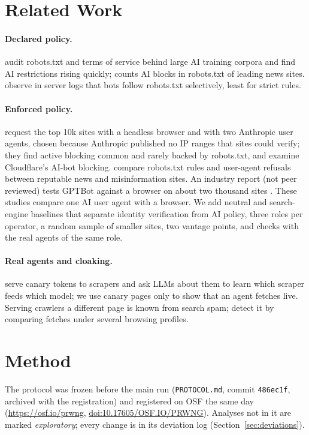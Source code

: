 \documentclass[sigconf,nonacm]{acmart}
\newif\ifanon
\newcommand{\osfdoi}{\href{https://doi.org/10.17605/OSF.IO/PRWNG}{doi:10.17605/OSF.IO/PRWNG}}
\begin{document}
\section{Related Work}
\label{sec:related}
\paragraph{Declared policy.} \citet{longpre2024consent} audit robots.txt and terms of service
behind large AI training corpora and find AI restrictions rising quickly;
\citet{fletcher2024news} counts AI blocks in robots.txt of leading news sites.
\citet{kim2025scrapers} observe in server logs that bots follow robots.txt selectively, least for
strict rules.

\paragraph{Enforced policy.} \citet{liu2025somesite} request the top 10k sites with a headless
browser and with two Anthropic user agents, chosen because Anthropic published no IP ranges that
sites could verify; they find active blocking common and rarely backed by robots.txt, and
examine Cloudflare's AI-bot blocking. \citet{steinacker2026misinfo} compare robots.txt rules and
user-agent refusals between reputable news and misinformation sites. An industry report (not
peer reviewed) tests GPTBot against a browser on about two thousand sites
\citep{hasdata2026index}. These studies compare one AI user agent with a browser. We add
neutral and search-engine baselines that separate identity verification from AI policy, three
roles per operator, a random sample of smaller sites, two vantage points, and checks with the
real agents of the same role.

\paragraph{Real agents and cloaking.} \citet{seiden2026canary} serve canary tokens to scrapers
and ask LLMs about them to learn which scraper feeds which model; we use canary pages only to show
that an agent fetches live. Serving crawlers a different page is known from search spam;
\citet{invernizzi2016cloak} detect it by comparing fetches under several browsing profiles.

\section{Method}
\label{sec:method}
The protocol was frozen before the main run (\texttt{PROTOCOL.md}, commit \texttt{486ec1f}, archived with the registration) and
registered on OSF the same day
\ifanon(link withheld)\else(\url{https://osf.io/prwng}, \osfdoi)\fi. Analyses not in it are
marked \emph{exploratory}; every change is in its deviation log (Section~\ref{sec:deviations}).
\end{document}

